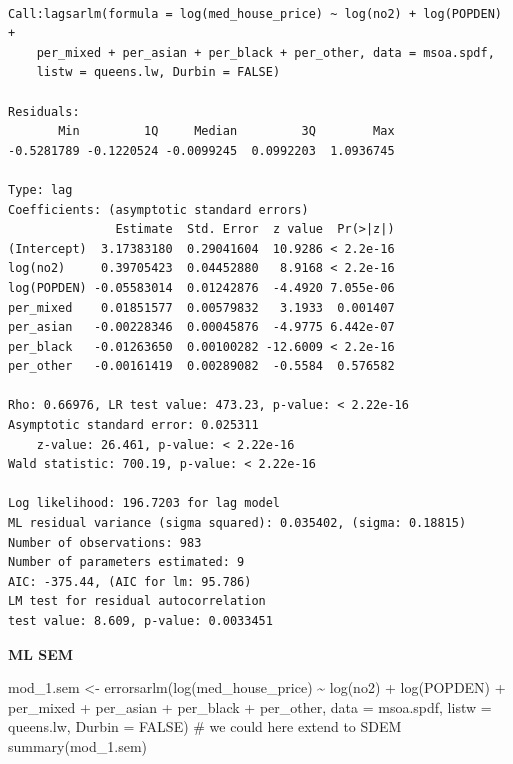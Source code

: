 \documentclass[
  letterpaper,
]{scrbook}
\newenvironment{Shaded}{\begin{snugshade}}{\end{snugshade}}
\newcommand{\AttributeTok}[1]{\textcolor[rgb]{0.40,0.45,0.13}{#1}}
\newcommand{\CommentTok}[1]{\textcolor[rgb]{0.37,0.37,0.37}{#1}}
\newcommand{\ConstantTok}[1]{\textcolor[rgb]{0.56,0.35,0.01}{#1}}
\newcommand{\FunctionTok}[1]{\textcolor[rgb]{0.28,0.35,0.67}{#1}}
\newcommand{\NormalTok}[1]{\textcolor[rgb]{0.00,0.23,0.31}{#1}}
\newcommand{\OtherTok}[1]{\textcolor[rgb]{0.00,0.23,0.31}{#1}}
\newcommand{\SpecialCharTok}[1]{\textcolor[rgb]{0.37,0.37,0.37}{#1}}
\begin{document}
\begin{verbatim}

Call:lagsarlm(formula = log(med_house_price) ~ log(no2) + log(POPDEN) + 
    per_mixed + per_asian + per_black + per_other, data = msoa.spdf, 
    listw = queens.lw, Durbin = FALSE)

Residuals:
       Min         1Q     Median         3Q        Max 
-0.5281789 -0.1220524 -0.0099245  0.0992203  1.0936745 

Type: lag 
Coefficients: (asymptotic standard errors) 
               Estimate  Std. Error  z value  Pr(>|z|)
(Intercept)  3.17383180  0.29041604  10.9286 < 2.2e-16
log(no2)     0.39705423  0.04452880   8.9168 < 2.2e-16
log(POPDEN) -0.05583014  0.01242876  -4.4920 7.055e-06
per_mixed    0.01851577  0.00579832   3.1933  0.001407
per_asian   -0.00228346  0.00045876  -4.9775 6.442e-07
per_black   -0.01263650  0.00100282 -12.6009 < 2.2e-16
per_other   -0.00161419  0.00289082  -0.5584  0.576582

Rho: 0.66976, LR test value: 473.23, p-value: < 2.22e-16
Asymptotic standard error: 0.025311
    z-value: 26.461, p-value: < 2.22e-16
Wald statistic: 700.19, p-value: < 2.22e-16

Log likelihood: 196.7203 for lag model
ML residual variance (sigma squared): 0.035402, (sigma: 0.18815)
Number of observations: 983 
Number of parameters estimated: 9 
AIC: -375.44, (AIC for lm: 95.786)
LM test for residual autocorrelation
test value: 8.609, p-value: 0.0033451
\end{verbatim}

\textbf{ML SEM}

\begin{Shaded}
\begin{Highlighting}[]
\NormalTok{mod\_1.sem }\OtherTok{\textless{}{-}} \FunctionTok{errorsarlm}\NormalTok{(}\FunctionTok{log}\NormalTok{(med\_house\_price) }\SpecialCharTok{\textasciitilde{}} \FunctionTok{log}\NormalTok{(no2) }\SpecialCharTok{+} \FunctionTok{log}\NormalTok{(POPDEN) }\SpecialCharTok{+}
\NormalTok{                          per\_mixed }\SpecialCharTok{+}\NormalTok{ per\_asian }\SpecialCharTok{+}\NormalTok{ per\_black }\SpecialCharTok{+}\NormalTok{ per\_other,  }
                        \AttributeTok{data =}\NormalTok{ msoa.spdf, }
                        \AttributeTok{listw =}\NormalTok{ queens.lw,}
                        \AttributeTok{Durbin =} \ConstantTok{FALSE}\NormalTok{) }\CommentTok{\# we could here extend to SDEM}
\FunctionTok{summary}\NormalTok{(mod\_1.sem)}
\end{Highlighting}
\end{Shaded}
\end{document}
